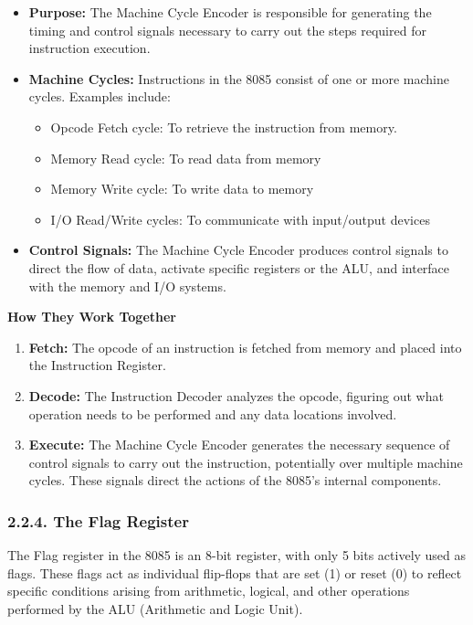 \documentclass[
]{article}
\begin{document}
\begin{itemize}
\item
  \textbf{Purpose:} The Machine Cycle Encoder is responsible for
  generating the timing and control signals necessary to carry out the
  steps required for instruction execution.
\item
  \textbf{Machine Cycles:} Instructions in the 8085 consist of one or
  more machine cycles. Examples include:

  \begin{itemize}
  \item
    Opcode Fetch cycle: To retrieve the instruction from memory.
  \item
    Memory Read cycle: To read data from memory
  \item
    Memory Write cycle: To write data to memory
  \item
    I/O Read/Write cycles: To communicate with input/output devices
  \end{itemize}
\item
  \textbf{Control Signals:} The Machine Cycle Encoder produces control
  signals to direct the flow of data, activate specific registers or the
  ALU, and interface with the memory and I/O systems.
\end{itemize}

\textbf{How They Work Together}

\begin{enumerate}
\def\labelenumi{\arabic{enumi}.}
\item
  \textbf{Fetch:} The opcode of an instruction is fetched from memory
  and placed into the Instruction Register.
\item
  \textbf{Decode:} The Instruction Decoder analyzes the opcode, figuring
  out what operation needs to be performed and any data locations
  involved.
\item
  \textbf{Execute:} The Machine Cycle Encoder generates the necessary
  sequence of control signals to carry out the instruction, potentially
  over multiple machine cycles. These signals direct the actions of the
  8085's internal components.
\end{enumerate}

\hypertarget{224-the-flag-register}{%
\subsubsection{2.2.4. The Flag Register}\label{224-the-flag-register}}

The Flag register in the 8085 is an 8-bit register, with only 5 bits
actively used as flags. These flags act as individual flip-flops that
are set (1) or reset (0) to reflect specific conditions arising from
arithmetic, logical, and other operations performed by the ALU
(Arithmetic and Logic Unit).
\end{document}
